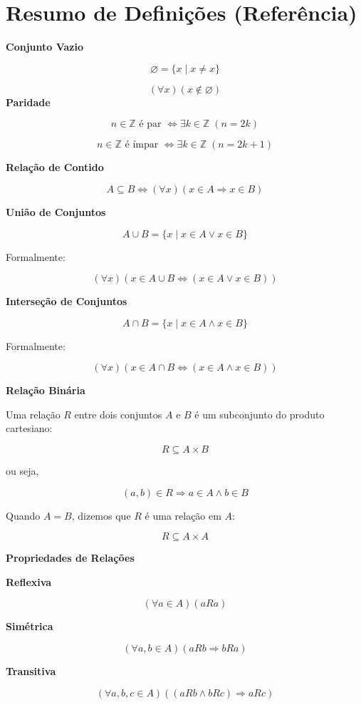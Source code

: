 \documentclass[12pt,a4paper]{article}
\begin{document}
\section*{Resumo de Definições (Referência)}

\textbf{Conjunto Vazio}


\[
\varnothing = \{x \mid x \neq x\}
\]


\[
(\forall x)(x \notin \varnothing)
\]
\textbf{Paridade}

\[
n \in \mathbb{Z} \text{ é par } \Leftrightarrow \exists k \in \mathbb{Z} \; (n = 2k)
\]

\[
n \in \mathbb{Z} \text{ é ímpar } \Leftrightarrow \exists k \in \mathbb{Z} \; (n = 2k + 1)
\]

\vspace{0.3cm}

\textbf{Relação de Contido}

\[
A \subseteq B \Leftrightarrow (\forall x)(x \in A \Rightarrow x \in B)
\]

\vspace{0.3cm}

\textbf{União de Conjuntos}

\[
A \cup B = \{x \mid x \in A \lor x \in B\}
\]

Formalmente:

\[
(\forall x)(x \in A \cup B \Leftrightarrow (x \in A \lor x \in B))
\]

\vspace{0.3cm}

\textbf{Interseção de Conjuntos}

\[
A \cap B = \{x \mid x \in A \land x \in B\}
\]

Formalmente:

\[
(\forall x)(x \in A \cap B \Leftrightarrow (x \in A \land x \in B))
\]

\vspace{0.3cm}

\textbf{Relação Binária}

Uma relação $R$ entre dois conjuntos $A$ e $B$ é um subconjunto do produto cartesiano:

\[
R \subseteq A \times B
\]

ou seja,

\[
(a,b) \in R \Rightarrow a \in A \land b \in B
\]

Quando $A=B$, dizemos que $R$ é uma relação em $A$:

\[
R \subseteq A \times A
\]

\vspace{0.3cm}

\textbf{Propriedades de Relações}

\textbf{Reflexiva}

\[
(\forall a \in A)(aRa)
\]

\textbf{Simétrica}

\[
(\forall a,b \in A)(aRb \Rightarrow bRa)
\]

\textbf{Transitiva}

\[
(\forall a,b,c \in A)((aRb \land bRc) \Rightarrow aRc)
\]
\end{document}
